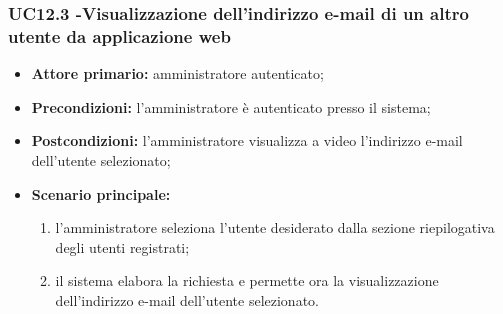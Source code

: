 \subsubsection{UC12.3 -Visualizzazione dell'indirizzo e-mail di un altro utente da applicazione web}
\begin{itemize}
	\item \textbf{Attore primario:} amministratore autenticato;

	\item \textbf{Precondizioni:} l'amministratore è autenticato presso il sistema;

	\item \textbf{Postcondizioni:} l'amministratore visualizza a video l'indirizzo e-mail dell'utente selezionato;

	\item \textbf{Scenario principale:}
		\begin{enumerate}
   			 \item  l'amministratore seleziona l'utente desiderato dalla sezione riepilogativa degli utenti registrati;
   			 \item  il sistema elabora la richiesta e permette ora la visualizzazione dell'indirizzo e-mail dell'utente selezionato.
		\end{enumerate}
\end{itemize}


